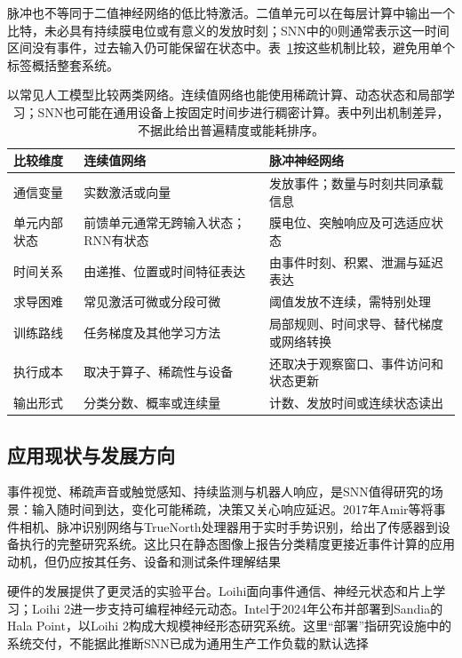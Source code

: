 脉冲也不等同于二值神经网络的低比特激活。二值单元可以在每层计算中输出一个比特，未必具有持续膜电位或有意义的发放时刻；SNN中的0则通常表示这一时间区间没有事件，过去输入仍可能保留在状态中。表~\ref{tab:snn-ann-comparison}按这些机制比较，避免用单个标签概括整套系统。
\begin{table}[htbp]
  \centering\small
  \begin{tabularx}{\linewidth}{@{}p{25mm}XX@{}}
    \toprule
    比较维度 & 连续值网络 & 脉冲神经网络 \\
    \midrule
    通信变量 & 实数激活或向量 & 发放事件；数量与时刻共同承载信息 \\
    单元内部状态 & 前馈单元通常无跨输入状态；RNN有状态 & 膜电位、突触响应及可选适应状态 \\
    时间关系 & 由递推、位置或时间特征表达 & 由事件时刻、积累、泄漏与延迟表达 \\
    求导困难 & 常见激活可微或分段可微 & 阈值发放不连续，需特别处理 \\
    训练路线 & 任务梯度及其他学习方法 & 局部规则、时间求导、替代梯度或网络转换 \\
    执行成本 & 取决于算子、稀疏性与设备 & 还取决于观察窗口、事件访问和状态更新 \\
    输出形式 & 分类分数、概率或连续量 & 计数、发放时间或连续状态读出 \\
    \bottomrule
  \end{tabularx}
  \caption{以常见人工模型比较两类网络。连续值网络也能使用稀疏计算、动态状态和局部学习；SNN也可能在通用设备上按固定时间步进行稠密计算。表中列出机制差异，不据此给出普遍精度或能耗排序。}
  \label{tab:snn-ann-comparison}
\end{table}
\FloatBarrier

\subsection{应用现状与发展方向}
\label{sec:snn-development}

事件视觉、稀疏声音或触觉感知、持续监测与机器人响应，是SNN值得研究的场景：输入随时间到达，变化可能稀疏，决策又关心响应延迟。2017年Amir等将事件相机、脉冲识别网络与TrueNorth处理器用于实时手势识别，给出了传感器到设备执行的完整研究系统。这比只在静态图像上报告分类精度更接近事件计算的应用动机，但仍应按其任务、设备和测试条件理解结果

硬件的发展提供了更灵活的实验平台。Loihi面向事件通信、神经元状态和片上学习；Loihi 2进一步支持可编程神经元动态。Intel于2024年公布并部署到Sandia的Hala Point，以Loihi 2构成大规模神经形态研究系统。这里“部署”指研究设施中的系统交付，不能据此推断SNN已成为通用生产工作负载的默认选择

